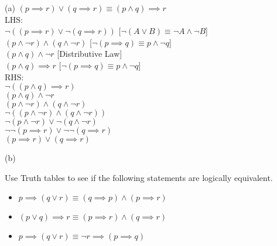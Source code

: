 \documentclass[addpoints]{exam}
\newenvironment{problem}[2][Problem]{\begin{trivlist}
    \item[\hskip \labelsep {\bfseries #1}\hskip \labelsep {\bfseries #2.}]}{\end{trivlist}}
\begin{document}
\begin{sloppypar}
\begin{questions}
\begin{solution}
        (a) $ (p \implies r) \lor (q \implies r)  \equiv  (p \land q) \implies r $ \\ 
        LHS: \\ 
        $ \neg((p \implies r) \lor \neg(q \implies r)) $ \hspace{10mm} {\color{red} [$ \neg (A \lor B) \equiv \neg A \land \neg B $]}\\ 
        $ (p \land \neg r) \land (q \land \neg r) $ \hspace{21.5mm} {\color{red} [$ \neg (p \implies q) \equiv p \land \neg q $]}\\ 
        $ (p \land q) \land \neg r $ \hspace{31mm} { \color{red} [Distributive Law]}\\ 
        $ (p \land q) \implies r $ \hspace{27.5mm} { \color{red} [$ \neg (p\implies q) \equiv p \land \neg q $]} \\ 
        RHS: \\ 
        $ \neg ((p \land q) \implies r) $ \\ 
        $ (p \land q) \land \neg r $ \\ 
        $ (p \land \neg r) \land (q \land \neg r) $ \\ 
        $ \neg ((p \land \neg r) \land (q \land \neg r)) $ \\ 
        $ \neg (p \land \neg r) \lor \neg(q \land \neg r) $ \\ 
        $ \neg \neg (p \implies r) \lor \neg \neg (q \implies r) $ \\ 
        $ (p \implies r) \lor (q \implies r) $ 

        \vspace{2mm}
        (b)
    \end{solution}
\end{questions}

\begin{problem}{8}
Use Truth tables to see if the following statements are logically equivalent.
\begin{itemize}
    \item [(a)] $ p \implies (q \lor r) \equiv (q \implies p) \land (p \implies r) $
    \item [(b)] $ (p \lor q) \implies r \equiv (p \implies r) \land (q \implies r) $
    \item [(c)] $ p \implies (q \lor r) \equiv \neg r \implies ( p \implies q) $
\end{itemize}

\end{problem}

\begin{questions}
    \question
    \begin{solution}
        
    \end{solution}

\end{questions}
\end{sloppypar}
\end{document}

